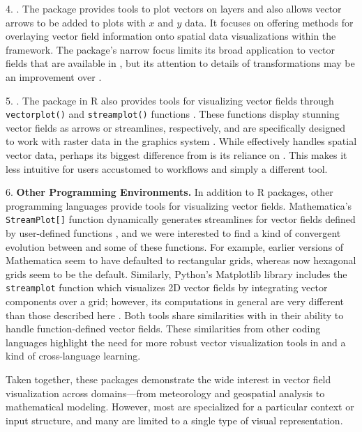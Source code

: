 4. . The  package provides tools to plot vectors on  layers and also allows vector arrows to be added to plots with \(x\) and \(y\) data. It focuses on offering methods for overlaying vector field information onto spatial data visualizations within the  framework. The package's narrow focus limits its broad application to vector fields that are available in , but its attention to details of transformations may be an improvement over  \citep{ggfields}.

5. . The  package in R also provides tools for visualizing vector fields through \texttt{vectorplot()} and \texttt{streamplot()} functions \citep{rasterVis}. These functions display stunning vector fields as arrows or streamlines, respectively, and are specifically designed to work with raster data in the  graphics system \citep{lattice}. While  effectively handles spatial vector data, perhaps its biggest difference from  is its reliance on . This makes it less intuitive for users accustomed to  workflows and simply a different tool.

6. \textbf{Other Programming Environments.} In addition to R packages, other programming languages provide tools for visualizing vector fields. Mathematica's \texttt{StreamPlot{[}{]}} function dynamically generates streamlines for vector fields defined by user-defined functions \citep{mathematica_streamplot}, and we were interested to find a kind of convergent evolution between  and some of these functions. For example, earlier versions of Mathematica seem to have defaulted to rectangular grids, whereas now hexagonal grids seem to be the default. Similarly, Python's Matplotlib library includes the \texttt{streamplot} function which visualizes 2D vector fields by integrating vector components over a grid; however, its computations in general are very different than those described here \citep{matplotlib_streamplot}. Both tools share similarities with  in their ability to handle function-defined vector fields. These similarities from other coding languages highlight the need for more robust vector visualization tools in  and a kind of cross-language learning.

Taken together, these packages demonstrate the wide interest in vector field visualization across domains---from meteorology and geospatial analysis to mathematical modeling. However, most are specialized for a particular context or input structure, and many are limited to a single type of visual representation.

